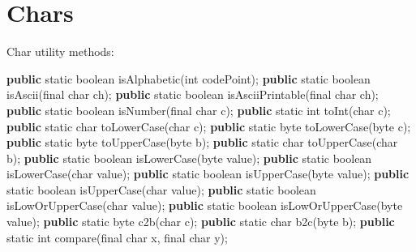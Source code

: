 \documentclass[
]{book}
\newenvironment{Shaded}{\begin{snugshade}}{\end{snugshade}}
\newcommand{\DataTypeTok}[1]{\textcolor[rgb]{0.13,0.29,0.53}{#1}}
\newcommand{\FunctionTok}[1]{\textcolor[rgb]{0.00,0.00,0.00}{#1}}
\newcommand{\KeywordTok}[1]{\textcolor[rgb]{0.13,0.29,0.53}{\textbf{#1}}}
\newcommand{\NormalTok}[1]{#1}
\begin{document}
\hypertarget{langx-java_references_utils_Chars}{%
\section{Chars}\label{langx-java_references_utils_Chars}}

Char utility methods:

\begin{Shaded}
\begin{Highlighting}[]
\KeywordTok{public} \DataTypeTok{static} \DataTypeTok{boolean} \FunctionTok{isAlphabetic}\NormalTok{(}\DataTypeTok{int}\NormalTok{ codePoint);}
\KeywordTok{public} \DataTypeTok{static} \DataTypeTok{boolean} \FunctionTok{isAscii}\NormalTok{(}\DataTypeTok{final} \DataTypeTok{char}\NormalTok{ ch);}
\KeywordTok{public} \DataTypeTok{static} \DataTypeTok{boolean} \FunctionTok{isAsciiPrintable}\NormalTok{(}\DataTypeTok{final} \DataTypeTok{char}\NormalTok{ ch);}
\KeywordTok{public} \DataTypeTok{static} \DataTypeTok{boolean} \FunctionTok{isNumber}\NormalTok{(}\DataTypeTok{final} \DataTypeTok{char}\NormalTok{ c);}
\KeywordTok{public} \DataTypeTok{static} \DataTypeTok{int} \FunctionTok{toInt}\NormalTok{(}\DataTypeTok{char}\NormalTok{ c);}
\KeywordTok{public} \DataTypeTok{static} \DataTypeTok{char} \FunctionTok{toLowerCase}\NormalTok{(}\DataTypeTok{char}\NormalTok{ c);}
\KeywordTok{public} \DataTypeTok{static} \DataTypeTok{byte} \FunctionTok{toLowerCase}\NormalTok{(}\DataTypeTok{byte}\NormalTok{ c);}
\KeywordTok{public} \DataTypeTok{static} \DataTypeTok{byte} \FunctionTok{toUpperCase}\NormalTok{(}\DataTypeTok{byte}\NormalTok{ b);}
\KeywordTok{public} \DataTypeTok{static} \DataTypeTok{char} \FunctionTok{toUpperCase}\NormalTok{(}\DataTypeTok{char}\NormalTok{ b);}
\KeywordTok{public} \DataTypeTok{static} \DataTypeTok{boolean} \FunctionTok{isLowerCase}\NormalTok{(}\DataTypeTok{byte}\NormalTok{ value);}
\KeywordTok{public} \DataTypeTok{static} \DataTypeTok{boolean} \FunctionTok{isLowerCase}\NormalTok{(}\DataTypeTok{char}\NormalTok{ value);}
\KeywordTok{public} \DataTypeTok{static} \DataTypeTok{boolean} \FunctionTok{isUpperCase}\NormalTok{(}\DataTypeTok{byte}\NormalTok{ value);}
\KeywordTok{public} \DataTypeTok{static} \DataTypeTok{boolean} \FunctionTok{isUpperCase}\NormalTok{(}\DataTypeTok{char}\NormalTok{ value);}
\KeywordTok{public} \DataTypeTok{static} \DataTypeTok{boolean} \FunctionTok{isLowOrUpperCase}\NormalTok{(}\DataTypeTok{char}\NormalTok{ value);}
\KeywordTok{public} \DataTypeTok{static} \DataTypeTok{boolean} \FunctionTok{isLowOrUpperCase}\NormalTok{(}\DataTypeTok{byte}\NormalTok{ value);}
\KeywordTok{public} \DataTypeTok{static} \DataTypeTok{byte} \FunctionTok{c2b}\NormalTok{(}\DataTypeTok{char}\NormalTok{ c);}
\KeywordTok{public} \DataTypeTok{static} \DataTypeTok{char} \FunctionTok{b2c}\NormalTok{(}\DataTypeTok{byte}\NormalTok{ b);}
\KeywordTok{public} \DataTypeTok{static} \DataTypeTok{int} \FunctionTok{compare}\NormalTok{(}\DataTypeTok{final} \DataTypeTok{char}\NormalTok{ x, }\DataTypeTok{final} \DataTypeTok{char}\NormalTok{ y);}
\end{Highlighting}
\end{Shaded}
\end{document}
